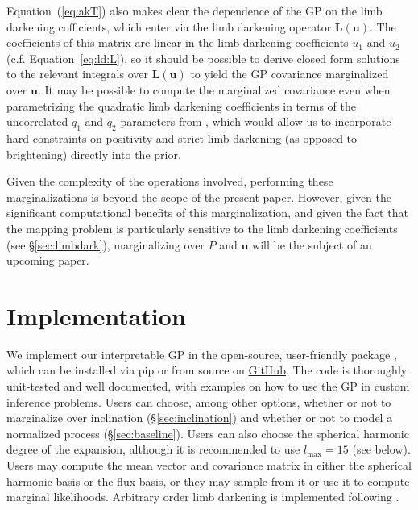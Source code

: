 \documentclass[modern]{aastex62}
\begin{document}
Equation~(\ref{eq:akT}) also makes clear the dependence of the GP on
the limb darkening cofficients, which enter via the limb darkening
operator $\mathbf{L}(\mathbf{u})$. The coefficients
of this matrix are linear in the limb darkening coefficients $u_1$ and $u_2$
(c.f. Equation~\ref{eq:ld:L}), so it should be possible to derive closed
form solutions to the relevant integrals over $\mathbf{L}(\mathbf{u})$ to
yield the GP covariance marginalized over $\mathbf{u}$. It may be
possible to compute the marginalized covariance even when parametrizing
the quadratic limb darkening
coefficients in terms of the uncorrelated $q_1$ and $q_2$ parameters from
\citet{?}, which would allow us to incorporate hard constraints on positivity
and strict limb darkening (as opposed to brightening) directly into the prior.

Given the complexity of the operations involved,
performing these marginalizations is beyond the scope of the present paper.
However, given the significant computational benefits of this marginalization,
and given the fact that the mapping problem is particularly sensitive to
the limb darkening coefficients (see \S\ref{sec:limbdark}), marginalizing over
$P$ and $\mathbf{u}$ will be the subject of an upcoming paper.

\section{Implementation}
\label{sec:implementation}

We implement our interpretable GP in the open-source, user-friendly
\Python package \starryprocess, which can be installed via \textsf{pip}\xspace
or from source on \href{https://github.com/rodluger/starry_process}{GitHub}.
The code is thoroughly unit-tested and well documented, with examples on how
to use the GP in custom inference problems. Users can choose, among other
options, whether or not
to marginalize over inclination (\S\ref{sec:inclination}) and
whether or not to model a normalized
process (\S\ref{sec:baseline}). Users can also choose the spherical harmonic
degree of the expansion, although it is recommended to use $l_\mathrm{max} = 15$
(see below).
Users may compute the mean vector and covariance matrix in either the spherical
harmonic basis or the flux basis, or they may sample from it or use it to
compute marginal likelihoods.
Arbitrary order limb darkening is implemented following
\citet{Agol2020}.
\end{document}

